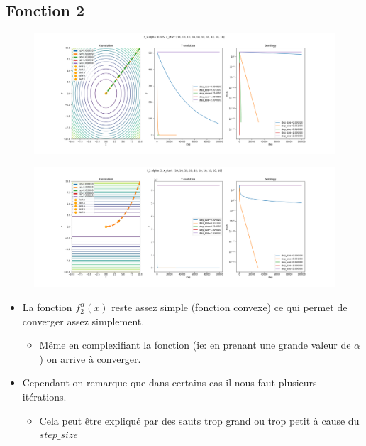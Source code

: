 \documentclass[twoside,10pt,a4paper]{article}
\numberwithin{equation}{section}					%
\numberwithin{figure}{section}						%
\begin{document}
\subsection{Fonction 2 }\label{sec:subsection2}
\begin{figure}[H]
    \centering
    \includegraphics[width=\textwidth]{imgs/fixed_sz/f_2_a-0.005_fixed_sz.png}
    \caption{}
\end{figure}
\begin{figure}[H]
    \centering
    \includegraphics[width=\textwidth]{imgs/fixed_sz/f_2_a-3_fixed_sz.png}
    \caption{}
\end{figure}
\begin{itemize}
	\item La fonction $f_2^{\alpha}(x)$ reste assez simple (fonction convexe) ce qui permet de converger assez simplement.
	\begin{itemize}
    	\item Même en complexifiant la fonction (ie: en prenant une grande valeur de $\alpha$) on arrive à converger.
	\end{itemize}
	\item Cependant on remarque que dans certains cas il nous faut plusieurs itérations.
	\begin{itemize}
    	\item Cela peut être expliqué par des sauts trop grand ou trop petit à cause du $step\_size$
	\end{itemize}
\end{itemize}
\end{document}
